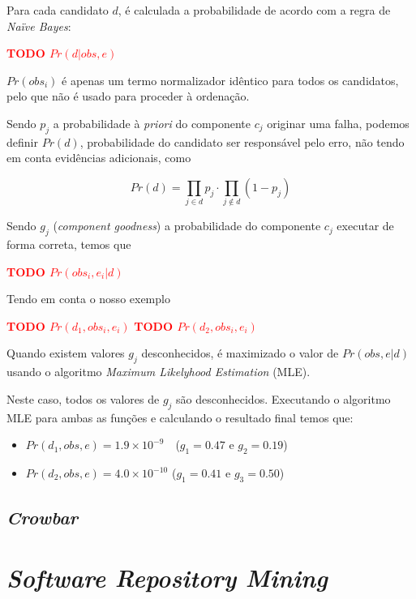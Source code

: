 Para cada candidato $d$, é calculada a probabilidade de acordo com a regra de \emph{Naïve Bayes}:

\textbf{\textcolor{red}{TODO $Pr(d | obs, e)$} }

$Pr(obs_i)$ é apenas um termo normalizador idêntico para todos os candidatos, pelo que não é usado para proceder à ordenação.

Sendo $p_j$ a probabilidade à \emph{priori} do componente $c_j$ originar uma falha, podemos definir $Pr(d)$, probabilidade do candidato ser responsável pelo erro, não tendo em conta evidências adicionais, como

$$ Pr(d) = \prod_{j \in d} p_j \cdot \prod_{j \notin d} (1 - p_j) $$

Sendo $g_j$ (\emph{component goodness}) a probabilidade do componente $c_j$ executar de forma correta, temos que

\textbf{\textcolor{red}{TODO $Pr(obs_i, e_i | d)$} }

Tendo em conta o nosso exemplo

\textbf{\textcolor{red}{TODO $Pr(d_1, obs_i, e_i)$} }
\textbf{\textcolor{red}{TODO $Pr(d_2, obs_i, e_i)$} }

Quando existem valores $g_j$ desconhecidos, é maximizado o valor de $Pr(obs, e | d)$ usando o algoritmo \emph{Maximum Likelyhood Estimation} (MLE).

Neste caso, todos os valores de $g_j$ são desconhecidos. Executando o algoritmo MLE para ambas as funções e calculando o resultado final temos que:


\begin{itemize}
\item $Pr(d_1, obs, e) = 1.9 \times 10^{-9}$\ \ ($g_1 = 0.47$ e $g_2 = 0.19$)
\item $Pr(d_2, obs, e) = 4.0 \times 10^{-10}$ ($g_1 = 0.41$ e $g_3 = 0.50$)
\end{itemize}


% 
%

\subsection{\emph{Crowbar}}

\section{\emph{Software Repository Mining}}

